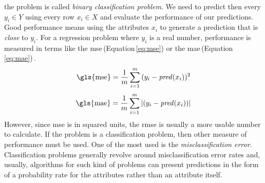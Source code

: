 \documentclass[USenglish]{uit-thesis}
\begin{document}
the problem is called \emph{binary classification problem}.
We need to predict then every $y_i \in Y$ using every row
$x_i \in X$ and evaluate the performance of our predictions.
Good performance means using the attributes $x_i$ to generate
a prediction that is \emph{close} to $y_i$. For a regression
problem where $y_i$ is a real number, performance is
measured in terms like the \gls{mse}\,(Equation\,\ref{eq:mse})
or the \gls{mae}\,(Equation\,\ref{eq:mae})\,\cite{bowles2015machine}.
\begin{equation}
\label{eq:mse}
\text{\gls{mse}} = \frac{1}{m}\sum_{i=1}^{m}{(y_i - \text{\emph{pred}}(x_i))^2}
\end{equation}
\begin{equation}
\label{eq:mae}
\text{\gls{mae}} = \frac{1}{m}\sum_{i=1}^{m}{|(y_i - \text{\emph{pred}}(x_i))|}
\end{equation}
However, since \gls{mse} is in squared units,
the \gls{rmse} is usually a more usable number to calculate.
If the problem is a classification problem,
then other measure of performance must be used.
One of the most used is the \emph{misclassification error}.
Classification problems generally revolve around
misclassification error rates and, usually,
algorithms for such kind of problems can
present predictions in the form of a probability
rate for the attributes rather than an attribute itself.
\end{document}
